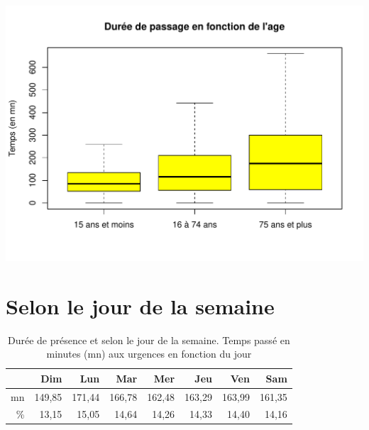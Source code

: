 \documentclass[12pt,english,french,twoside]{book}\usepackage[]{graphicx}\usepackage[]{color}
\makeatletter
\def\maxwidth{ %
  \ifdim\Gin@nat@width>\linewidth
    \linewidth
  \else
    \Gin@nat@width
  \fi
}
\newenvironment{knitrout}{}{} %
\makeatother
\begin{document}
\begin{center}
\begin{knitrout}
\color{fgcolor}
\includegraphics[width=\maxwidth]{figure/age_groupe2-1} 

\end{knitrout}
 \label{fig:bp_age}
\end{center}


\section{Selon le jour de la semaine}

\begin{table}[ht]
\centering
\begin{tabular}{rrrrrrrr}
  \hline
 & Dim & Lun & Mar & Mer & Jeu & Ven & Sam \\ 
  \hline
mn & 149,85 & 171,44 & 166,78 & 162,48 & 163,29 & 163,99 & 161,35 \\ 
  \% & 13,15 & 15,05 & 14,64 & 14,26 & 14,33 & 14,40 & 14,16 \\ 
   \hline
\end{tabular}
\caption[Durée de présence et jour de la semaine]{Durée de présence et selon le jour de la semaine. Temps passé en minutes (mn) aux urgences en fonction du jour} 
\label{tab:jour_semaine}
\end{table}
\end{document}
